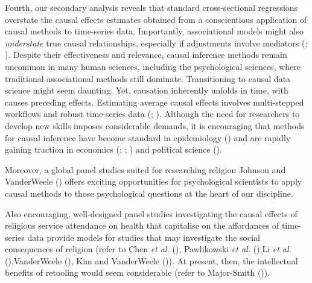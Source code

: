 \documentclass[
  single column]{article}
\begin{document}
Fourth, our secondary analysis reveals that standard cross-sectional
regressions overstate the causal effects estimates obtained from a
conscientious application of causal methods to time-series data.
Importantly, associational models might also \emph{understate} true
causal relationships, especially if adjustments involve mediators
(;
). Despite
their effectiveness and relevance, causal inference methods remain
uncommon in many human sciences, including the psychological sciences,
where traditional associational methods still dominate. Transitioning to
causal data science might seem daunting. Yet, causation inherently
unfolds in time, with causes preceding effects. Estimating average
causal effects involves multi-stepped workflows and robust time-series
data (;
). Although the need for
researchers to develop new skills imposes considerable demands, it is
encouraging that methods for causal inference have become standard in
epidemiology () and are
rapidly gaining traction in economics
(;
;
) and political science
().

Moreover, a global panel studies suited for researching religion Johnson
and VanderWeele () offers exciting
opportunities for psychological scientists to apply causal methods to
those psychological questions at the heart of our discipline.

Also encouraging, well-designed panel studies investigating the causal
effects of religious service attendance on health that capitalise on the
affordances of time-series data provide models for studies that may
investigate the social consequences of religion (refer to Chen \emph{et
al.} (), Pawlikowski \emph{et al.}
(),Li \emph{et al.}
(),VanderWeele
(),
Kim and VanderWeele ()). At
present, then, the intellectual benefits of retooling would seem
considerable (refer to Major-Smith
()).
\end{document}
